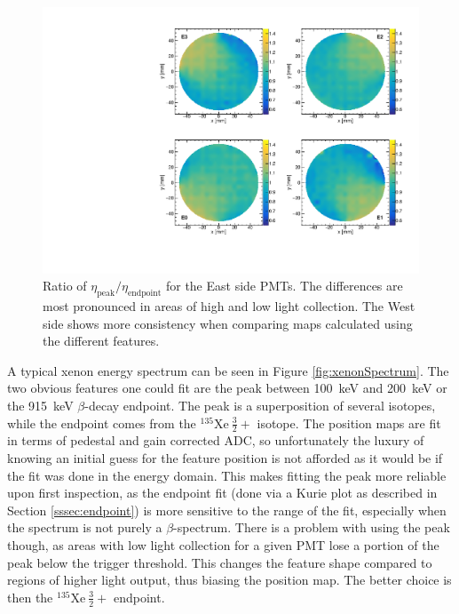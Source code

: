 \begin{figure}[h] 
\centering
\includegraphics[scale=.55]{4-UCNACalibrations/posmapComp_4_5mm_endpoint_vs_peak.pdf}
\caption{Ratio of $\eta_{\mathrm{peak}} / \eta_{\mathrm{endpoint}}$ for the East side PMTs. The differences
  are most pronounced in areas of high and low light collection. The West side shows more
  consistency when comparing maps calculated using the different features.}
\label{fig:posmapCompare}
\end{figure}

A typical xenon energy spectrum can be seen in Figure \ref{fig:xenonSpectrum}. The two obvious features one could
fit are the peak between 100~keV and 200~keV or the 915~keV $\beta$-decay endpoint. The peak is a
superposition of several isotopes, while the endpoint comes from the
$^{135}\mathrm{Xe~}\frac{3}{2}+$ isotope. The position maps are fit in terms of pedestal and gain corrected ADC,
so unfortunately the luxury of knowing an initial guess for the feature position is not afforded as it would
be if the fit was done in the energy domain. This makes
fitting the peak more reliable upon first inspection, as the endpoint fit (done via a Kurie plot as described
in Section \ref{sssec:endpoint}) is more sensitive to the range of the fit, especially when the spectrum is not
purely a $\beta$-spectrum. There is a problem with using the peak though, as areas with low light collection
for a given PMT lose a portion of the peak below the trigger threshold. This changes the feature shape
compared to regions of higher light output, thus biasing the position map. The better choice is then the
$^{135}\mathrm{Xe~}\frac{3}{2}+$ endpoint. 

